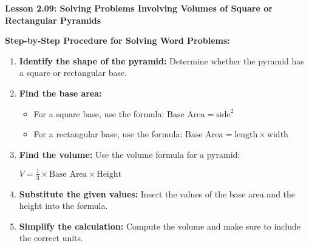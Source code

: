 \begin{center}
\textbf{Lesson 2.09: Solving Problems Involving Volumes of Square or Rectangular Pyramids}
\end{center}

\vspace*{-1.5ex}

\noindent \textbf{Step-by-Step Procedure for Solving Word Problems:}
\begin{enumerate}
    \item \textbf{Identify the shape of the pyramid:} Determine whether the pyramid has a square or rectangular base.
    \item \textbf{Find the base area:} 
    \begin{itemize}
        \item For a square base, use the formula: 
         \(\text{Base Area} = \text{side}^2\)
 
        \item For a rectangular base, use the formula:
        \( \text{Base Area} = \text{length} \times \text{width}\)
        
    \end{itemize}
    \item \textbf{Find the volume:} Use the volume formula for a pyramid:

      {\centering $ 
    V = \frac{1}{3} \times \text{Base Area} \times \text{Height}
  $\par}      
    \item \textbf{Substitute the given values:} Insert the values of the base area and the height into the formula.
    \item \textbf{Simplify the calculation:} Compute the volume and make sure to include the correct units.
\end{enumerate}



